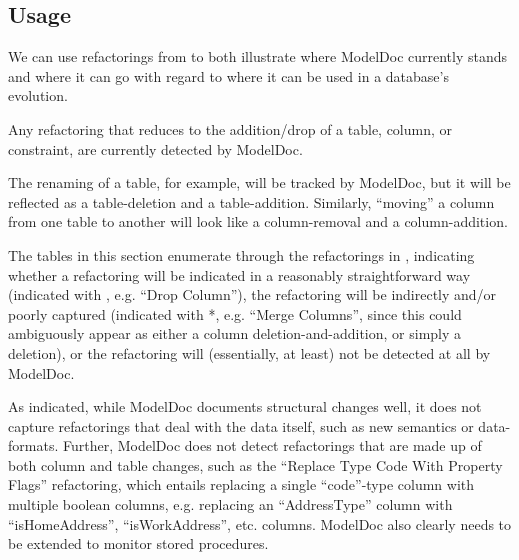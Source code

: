 \documentclass{acm_proc_article-sp}
\begin{document}
\subsection{Usage}

We can use refactorings from \cite{ambler:refactoring} to both illustrate where
ModelDoc currently stands and where it can go with regard to where it can be
used in a database's evolution.

Any refactoring that reduces to the addition/drop of a table, column, or
constraint, are currently detected by ModelDoc.

The renaming of a table, for example, will be tracked by ModelDoc, but it will
be reflected as a table-deletion and a table-addition.  Similarly, ``moving'' a
column from one table to another will look like a column-removal and a
column-addition.

The tables in this section enumerate through the refactorings in
\cite{ambler:refactoring}, indicating whether a refactoring will be
indicated in a reasonably straightforward way (indicated with \checkmark, e.g.
``Drop Column''), the refactoring will be indirectly and/or poorly captured
(indicated with *, e.g. ``Merge Columns'', since this could ambiguously
appear as either a column deletion-and-addition, or simply a deletion), or the
refactoring will (essentially, at least) not be detected at all by ModelDoc.

As indicated, while ModelDoc documents structural changes well, it does not
capture refactorings that deal with the data itself, such as new
semantics or data-formats. Further, ModelDoc does not detect refactorings that
are made up of both column and table changes, such as the ``Replace Type Code
With Property Flags'' refactoring, which entails replacing a single
``code''-type column with multiple boolean columns, e.g. replacing an
``AddressType'' column with ``isHomeAddress'', ``isWorkAddress'', etc. columns.
ModelDoc also clearly needs to be extended to monitor stored procedures.
\end{document}
